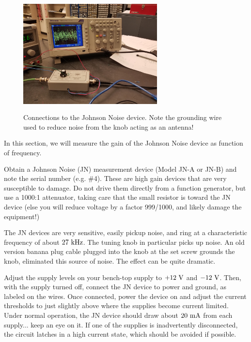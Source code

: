 \documentclass[12pt]{article}
\begin{document}
\begin{figure}[htbp]
\begin{center}
{\includegraphics[width=0.65\textwidth]{figs/antenna_grounded.jpg}}
\end{center}
\caption{\label{fig:plan} Connections to the Johnson Noise device.  Note the grounding wire used to reduce noise from the knob acting as an antenna!}
\end{figure}

In this section, we will measure the gain of the Johnson Noise device as function of frequency.

Obtain a Johnson Noise (JN) measurement device (Model JN-A or JN-B) and note the serial number (e.g. \#4).  These are high gain devices that are very susceptible to damage.  Do not drive them directly from a function generator, but use a 1000:1 attenuator, taking care that the small resistor is toward the JN device (else you will reduce voltage by a factor 999/1000, and likely damage the equipment!)  

The JN devices are very sensitive, easily pickup noise, and ring at a characteristic frequency of about $27~{\rm kHz}$.  The tuning knob in particular picks up noise.  An old version banana plug cable plugged into the knob at the set screw grounds the knob, eliminated this source of noise.  The effect can be quite dramatic. 

Adjust the supply levels on your bench-top supply to $+12~{\rm V}$ and $-12~{\rm V}$.  Then, with the supply turned off, connect the JN device to power and ground, as labeled on the wires.  Once connected, power the device on and adjust the current thresholds to just slightly above where the supplies become current limited.  Under normal operation, the JN device should draw about $20~\rm mA$ from each supply... keep an eye on it.  If one of the supplies is inadvertently disconnected, the circuit latches in a high current state, which should be avoided if possible.
\end{document}
